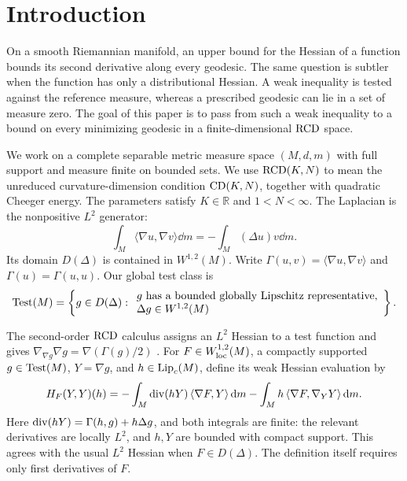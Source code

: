 \section{Introduction}
\label{sec:introduction}

On a smooth Riemannian manifold, an upper bound for the Hessian of a
function bounds its second derivative along every geodesic. The same
question is subtler when the function has only a distributional
Hessian. A weak inequality is tested against the reference measure,
whereas a prescribed geodesic can lie in a set of measure zero. The
goal of this paper is to pass from such a weak inequality to a bound
on every minimizing geodesic in a finite-dimensional \(\mathrm{RCD}\) space.

We work on a complete separable metric measure space \((M,d,m)\)
with full support and measure finite on bounded sets. We use
\(\mathrm{RCD}(K,N)\) to mean the unreduced curvature-dimension condition
\(\mathrm{CD}(K,N)\), together with quadratic Cheeger energy. The parameters
satisfy \(K\in\mathbb R\) and \(1<N<\infty\).
The Laplacian is the nonpositive \(L^2\) generator:
\[
\int_M\langle\nabla u,\nabla v\rangle\dd m
=-\int_M(\Delta u)v\dd m.
\]
Its domain \(D(\Delta)\) is contained in \(W^{1,2}(M)\).
Write \(\Gamma(u,v)=\langle\nabla u,\nabla v\rangle\) and
\(\Gamma(u)=\Gamma(u,u)\). Our global test class is
\begin{equation}
\label{eq:test-class}
\operatorname{Test}(M)=\left\{g\in D(\Delta):
\begin{array}{l}
 g\text{ has a bounded globally Lipschitz representative},\\
 \Delta g\in W^{1,2}(M)
\end{array}\right\}.
\end{equation}

The second-order \(\mathrm{RCD}\) calculus assigns an \(L^2\) Hessian to a
test function and gives
\(\nabla_{\nabla g}\nabla g=\nabla(\Gamma(g)/2)\)
\cite{Gigli2018}. For \(F\in W^{1,2}_{\rm loc}(M)\), a compactly
supported \(g\in\operatorname{Test}(M)\), \(Y=\nabla g\), and
\(h\in\operatorname{Lip}_c(M)\), define its weak Hessian evaluation by
\begin{equation}
\label{eq:weak-hessian}
H_F(Y,Y)(h)
=-\int_M\operatorname{div}(hY)\,\langle\nabla F,Y\rangle\,\mathrm d m
-\int_M h\,\langle\nabla F,\nabla_YY\rangle\,\mathrm d m.
\end{equation}
Here \(\operatorname{div}(hY)=\Gamma(h,g)+h\Delta g\), and both integrals
are finite: the relevant derivatives are locally \(L^2\), and
\(h,Y\) are bounded with compact support. This agrees with the
usual \(L^2\) Hessian when \(F\in D(\Delta)\). The definition
itself requires only first derivatives of \(F\).

